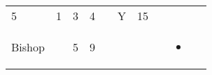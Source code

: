 \documentclass[12pt]{article}
\newcommand{\indexClass}[1]{\index{#1}}
\newcommand{\class}[1]{#1\indexClass{#1}}
\begin{document}
\begin{longtable}[]{@{}llllllllll@{}}
\begin{minipage}[t]{0.06\columnwidth}
5
\strut\end{minipage} &
\begin{minipage}[t]{0.06\columnwidth}\raggedright\strut
1
\strut\end{minipage} &
\begin{minipage}[t]{0.06\columnwidth}\raggedright\strut
3
\strut\end{minipage} &
\begin{minipage}[t]{0.06\columnwidth}\raggedright\strut
4
\strut\end{minipage} &
\begin{minipage}[t]{0.06\columnwidth}\raggedright\strut
\strut\end{minipage} &
\begin{minipage}[t]{0.07\columnwidth}\raggedright\strut
Y
\strut\end{minipage} &
\begin{minipage}[t]{0.08\columnwidth}\raggedright\strut
15
\strut\end{minipage}\tabularnewline
\begin{minipage}[t]{0.13\columnwidth}\raggedright\strut
\class{Bishop}
\strut\end{minipage} &
\begin{minipage}[t]{0.06\columnwidth}\raggedright\strut
\strut\end{minipage} &
\begin{minipage}[t]{0.06\columnwidth}\raggedright\strut
5
\strut\end{minipage} &
\begin{minipage}[t]{0.06\columnwidth}\raggedright\strut
9
\strut\end{minipage} &
\begin{minipage}[t]{0.06\columnwidth}\raggedright\strut
\strut\end{minipage} &
\begin{minipage}[t]{0.06\columnwidth}\raggedright\strut
\strut\end{minipage} &
\begin{minipage}[t]{0.06\columnwidth}\raggedright\strut
\strut\end{minipage} &
\begin{minipage}[t]{0.06\columnwidth}\raggedright\strut
\strut\end{minipage} &
\begin{minipage}[t]{0.07\columnwidth}\raggedright\strut
\begin{itemize}
\item
\end{itemize}
\strut\end{minipage} &

\end{longtable}
\end{document}
